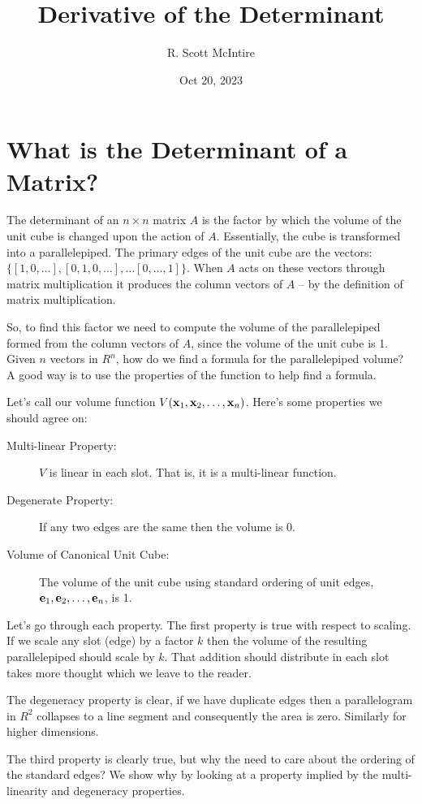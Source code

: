 \documentclass{article}
\title{Derivative of the Determinant}
\author{R. Scott McIntire}
\date{Oct 20, 2023}
\begin{document}
\maketitle

\section{What is the Determinant of a Matrix?}
The determinant of an $n\times n$ matrix $A$ is the factor by which the volume of
the unit cube is changed upon the action of $A$. Essentially, the cube is
transformed into a parallelepiped. The primary edges of the unit cube are the
vectors: $\{ [1, 0, \ldots], [0, 1, 0, \ldots], \ldots [0, \dots, 1]\}$.
When $A$ acts on these vectors through matrix multiplication it
produces the column vectors of $A$ -- by the definition of matrix multiplication.

So, to find this factor we need to compute the volume of the parallelepiped formed
from the column vectors of $A$, since the volume of the unit cube is 1.
Given $n$ vectors in $R^n$, how do we find a formula for the parallelepiped volume?
A good way is to use the properties of the function to help find a formula.

Let's call our volume function $V({\bf x}_1, {\bf x}_2, \ldots, {\bf x}_n)$.
Here's some properties we should agree on:
\begin{description}
\item[Multi-linear Property:]{$V$ is linear in each slot. That is,
    it is a multi-linear function.}
\item[Degenerate Property:]{If any two edges are the same then the volume is $0$.}
\item[Volume of Canonical Unit Cube:]{The volume of the unit cube using
    standard ordering of unit edges, ${\bf e}_1, {\bf e}_2, \ldots , {\bf e}_n$, is 1.}
\end{description}
Let's go through each property.
The first property is true with respect to scaling. If we scale any slot
(edge) by a factor
$k$ then the volume of the resulting parallelepiped should scale by $k$.
That addition should distribute in each slot takes more thought which we leave
to the reader.

The degeneracy property is clear, if we have duplicate edges then a parallelogram
in $R^2$ collapses to a line segment and consequently the area is zero. Similarly
for higher dimensions.

The third property is clearly true, but why the need to care about the ordering
of the standard edges? We show why by looking at a property implied by the
multi-linearity and degeneracy properties.
    
\end{document}
